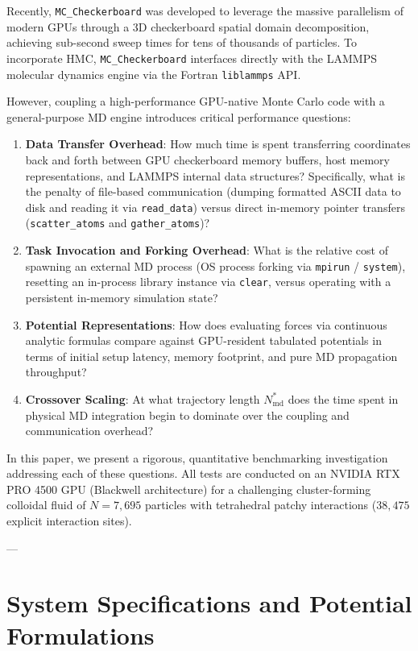 \documentclass[11pt,a4paper]{article}
\begin{document}
Recently, \texttt{MC\_Checkerboard}\cite{gonzalez2026checkerboard} was developed to leverage the massive parallelism of modern GPUs through a 3D checkerboard spatial domain decomposition, achieving sub-second sweep times for tens of thousands of particles. To incorporate HMC, \texttt{MC\_Checkerboard} interfaces directly with the LAMMPS molecular dynamics engine\cite{thompson2022lammps} via the Fortran \texttt{liblammps} API.

However, coupling a high-performance GPU-native Monte Carlo code with a general-purpose MD engine introduces critical performance questions:
\begin{enumerate}
    \item \textbf{Data Transfer Overhead}: How much time is spent transferring coordinates back and forth between GPU checkerboard memory buffers, host memory representations, and LAMMPS internal data structures? Specifically, what is the penalty of file-based communication (dumping formatted ASCII data to disk and reading it via \texttt{read\_data}) versus direct in-memory pointer transfers (\texttt{scatter\_atoms} and \texttt{gather\_atoms})?
    \item \textbf{Task Invocation and Forking Overhead}: What is the relative cost of spawning an external MD process (OS process forking via \texttt{mpirun} / \texttt{system}), resetting an in-process library instance via \texttt{clear}, versus operating with a persistent in-memory simulation state?
    \item \textbf{Potential Representations}: How does evaluating forces via continuous analytic formulas compare against GPU-resident tabulated potentials in terms of initial setup latency, memory footprint, and pure MD propagation throughput?
    \item \textbf{Crossover Scaling}: At what trajectory length $N_{\mathrm{md}}^*$ does the time spent in physical MD integration begin to dominate over the coupling and communication overhead?
\end{enumerate}

In this paper, we present a rigorous, quantitative benchmarking investigation addressing each of these questions. All tests are conducted on an NVIDIA RTX PRO 4500 GPU (Blackwell architecture) for a challenging cluster-forming colloidal fluid of $N = 7{,}695$ particles with tetrahedral patchy interactions ($38{,}475$ explicit interaction sites).

---

\section{System Specifications and Potential Formulations}
\end{document}
